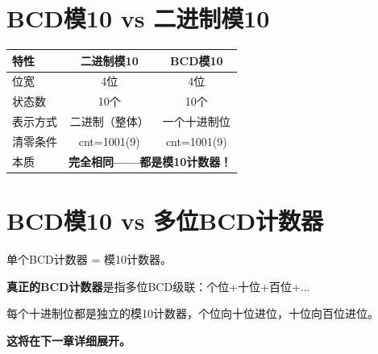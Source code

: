\section{BCD模10 vs 二进制模10}

\begin{center}
\begin{tabular}{|l|c|c|}
\hline
\textbf{特性} & \textbf{二进制模10} & \textbf{BCD模10} \\
\hline
位宽 & 4位 & 4位 \\
状态数 & 10个 & 10个 \\
表示方式 & 二进制（整体） & 一个十进制位 \\
清零条件 & cnt=1001(9) & cnt=1001(9) \\
本质 & \multicolumn{2}{c|}{\textbf{完全相同——都是模10计数器！}} \\
\hline
\end{tabular}
\end{center}

\section{BCD模10 vs 多位BCD计数器}

单个BCD计数器 = 模10计数器。

\textbf{真正的BCD计数器}是指多位BCD级联：个位+十位+百位+...

每个十进制位都是独立的模10计数器，个位向十位进位，十位向百位进位。

\textbf{这将在下一章详细展开。}
